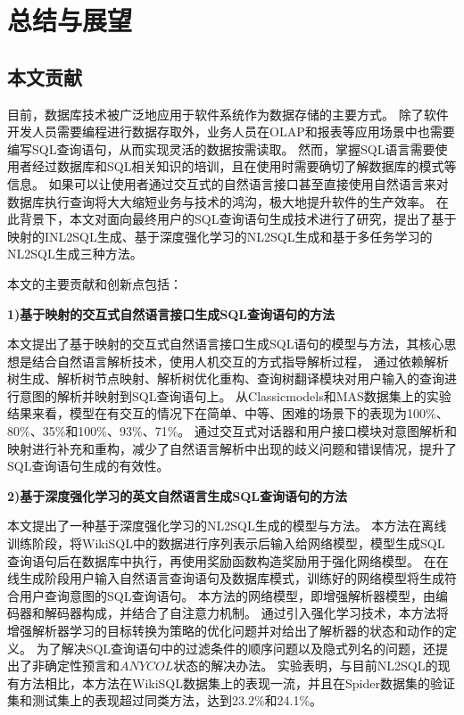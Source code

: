 \chapter{总结与展望}
\label{chap:conculution}
\section{本文贡献}

目前，数据库技术被广泛地应用于软件系统作为数据存储的主要方式。
除了软件开发人员需要编程进行数据存取外，业务人员在OLAP和报表等应用场景中也需要编写SQL查询语句，从而实现灵活的数据按需读取。
然而，掌握SQL语言需要使用者经过数据库和SQL相关知识的培训，且在使用时需要确切了解数据库的模式等信息。
如果可以让使用者通过交互式的自然语言接口甚至直接使用自然语言来对数据库执行查询将大大缩短业务与技术的鸿沟，极大地提升软件的生产效率。
在此背景下，本文对面向最终用户的SQL查询语句生成技术进行了研究，提出了基于映射的INL2SQL生成、基于深度强化学习的NL2SQL生成和基于多任务学习的NL2SQL生成三种方法。

本文的主要贡献和创新点包括：

\textbf{1)基于映射的交互式自然语言接口生成SQL查询语句的方法}

本文提出了基于映射的交互式自然语言接口生成SQL语句的模型与方法，其核心思想是结合自然语言解析技术，使用人机交互的方式指导解析过程，
通过依赖解析树生成、解析树节点映射、解析树优化重构、查询树翻译模块对用户输入的查询进行意图的解析并映射到SQL查询语句上。
从Classicmodels和MAS数据集上的实验结果来看，模型在有交互的情况下在简单、中等、困难的场景下的表现为100\%、80\%、35\%和100\%、93\%、71\%。
通过交互式对话器和用户接口模块对意图解析和映射进行补充和重构，减少了自然语言解析中出现的歧义问题和错误情况，提升了SQL查询语句生成的有效性。

\textbf{2)基于深度强化学习的英文自然语言生成SQL查询语句的方法}

本文提出了一种基于深度强化学习的NL2SQL生成的模型与方法。
本方法在离线训练阶段，将WikiSQL中的数据进行序列表示后输入给网络模型，模型生成SQL查询语句后在数据库中执行，再使用奖励函数构造奖励用于强化网络模型。
在在线生成阶段用户输入自然语言查询语句及数据库模式，训练好的网络模型将生成符合用户查询意图的SQL查询语句。
本方法的网络模型，即增强解析器模型，由编码器和解码器构成，并结合了自注意力机制。
通过引入强化学习技术，本方法将增强解析器学习的目标转换为策略的优化问题并对给出了解析器的状态和动作的定义。
为了解决SQL查询语句中的过滤条件的顺序问题以及隐式列名的问题，还提出了非确定性预言和$ANYCOL$状态的解决办法。
实验表明，与目前NL2SQL的现有方法相比，本方法在WikiSQL数据集上的表现一流，并且在Spider数据集的验证集和测试集上的表现超过同类方法，达到23.2\%和24.1\%。

